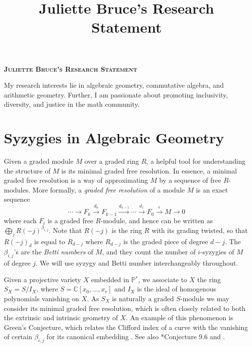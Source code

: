\documentclass[11pt,reqno]{amsart}
\title{Juliette Bruce's Research Statement}
\theoremstyle{remark}
\newcommand{\C}{\mathbb{C}}
\renewcommand{\P}{\mathbb{P}}
\begin{document}
 

\begingroup  
  \centering
  \large\scshape\bfseries Juliette Bruce's Research Statement\\[1em]
\endgroup


\setcounter{section}{0}

My research interests lie in algebraic geometry, commutative algebra, and arithmetic geometry. Further, I am passionate about promoting inclusivity, diversity, and justice in the math community.

\section{Syzygies in Algebraic Geometry}

Given a graded module $M$ over a graded ring $R$, a helpful tool for understanding the structure of $M$ is its minimal graded free resolution. In essence, a minimal graded free resolution is a way of approximating $M$ by a sequence of free $R$-modules. More formally, a \textit{graded free resolution} of a module $M$ is an exact sequence 
\[
\cdots \xrightarrow{} F_{k} \xrightarrow{d_{k}} F_{k-1} \xrightarrow{d_{k-1}} \cdots \xrightarrow{d_{1}} F_{0}\xrightarrow{\epsilon}M\xrightarrow{} 0
\]
where each $F_{i}$ is a graded free $R$-module, and hence can be written as $\bigoplus_{j}R(-j)^{\beta_{i,j}}$. Note that $R(-j)$ is the ring $R$ with its grading twisted, so that $R(-j)_{d}$ is equal to $R_{d-j}$ where $R_{d-j}$ is the graded piece of degree $d-j$. The $\beta_{i,j}$'s are the \textit{Betti numbers} of $M$, and they count the number of $i$-syzygies of $M$ of degree $j$. We will use syzygy and Betti number interchangeably throughout. 

Given a projective variety $X$ embedded in $\P^r$, we associate to $X$ the ring $S_X=S/I_X$, where $S=\C[x_0,\ldots,x_r]$ and $I_X$ is the ideal of homogenous polynomials vanishing on $X$. As $S_X$ is naturally a graded $S$-module we may consider its minimal graded free resolution, which is often closely related to both the extrinsic and intrinsic geometry of $X$.  An example of this phenomenon
 is Green's Conjecture, which relates the Clifford index of a curve with the vanishing of certain $\beta_{i,j}$ for its canonical embedding \cite{voisin02, voisin05, aproduFarkas19}. See also \cite{eisenbud05}*{Conjecture 9.6} and \cite{schreyer86, bayerEisenbud91}.
\end{document}
